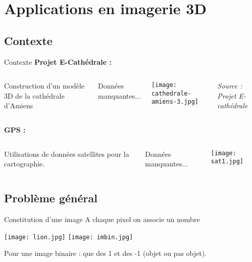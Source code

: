 \documentclass[11pt]{beamer}
\begin{document}
\section{Applications en imagerie 3D}
\subsection{Contexte}
\begin{frame}{Contexte}
\textbf{Projet E-Cathédrale :}
\begin{columns}
\begin{block}{}
Construction d'un modèle 3D de la cathédrale d'Amiens
\end{block}
\begin{alertblock}{}
Données manquantes...
\end{alertblock}
\begin{center}
\texttt{[image: cathedrale-amiens-3.jpg]}
\end{center}
\begin{tiny}
\begin{flushright}
\textit{Source : Projet E-cathédrale}
\end{flushright}
\end{tiny}
\end{columns}
\end{frame}


\begin{frame}
\textbf{GPS :}
\begin{columns}
\begin{block}{}
Utilisations de données satellites pour la cartographie.
\end{block}
\begin{alertblock}{}
Données manquantes...
\end{alertblock}
\begin{center}
\texttt{[image: sat1.jpg]}
\end{center}
\end{columns}
\end{frame}

\subsection{Problème général}
\begin{frame}{Constitution d'une image}
A chaque pixel on associe un nombre

\begin{center}
\texttt{[image: lion.jpg]}
\texttt{[image: imbin.jpg]}
\end{center}

Pour une image binaire : que des 1 et des -1 (objet ou pas objet).

\end{frame}
\end{document}
